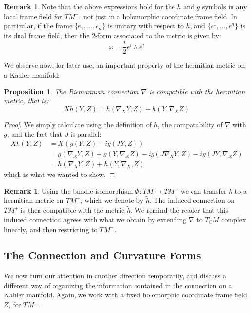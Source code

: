 \documentclass[11pt]{amsart}
\newtheorem{prop}[subsection]{Proposition}
\theoremstyle{definition}
\newtheorem{remark}[subsection]{Remark}
\def \C{ \mathbb{C} }
\def \hsquig{ \tilde{h} }
\begin{document}
\begin{remark}  Note that the above expressions hold for the $h$ and $g$ symbols in any local frame field for $TM^{+}$, not just in a holomorphic coordinate frame field.  In particular, if the frame $\{ e_1, \ldots, e_n \}$ is unitary with respect to $h$, and $ \{ e^1, \ldots, e^n \} $ is its dual frame field, then the 2-form associated to the metric is given by:
%
$$ \omega = \frac{i}{2} e^i \wedge \bar{e}^i $$
%
\end{remark}

 We observe now, for later use, an important property of the hermitian metric on a Kahler manifold:
%
\begin{prop} The Riemannian connection $\nabla$ is compatible with the hermitian metric, that is:
%
$$ X h( Y,Z ) = h( \nabla_X Y, Z ) + h( Y, \nabla_X Z ) $$
%
\end{prop}
%
\begin{proof}
We simply calculate using the definition of $h$, the compatability of $\nabla$ with $g$, and the fact that $J$ is parallel:
%
\begin{align*}
X h(Y,Z) &= X( g(Y,Z) - i g( JY, Z ) ) \\
&= g( \nabla_X Y, Z ) + g( Y, \nabla_X Z ) - i g( J \nabla_X Y, Z ) - i g( JY, \nabla_X Z ) \\
&= h( \nabla_X Y, Z ) + h( Y, \nabla_X, Z)
\end{align*}
%
which is what we wanted to show.
%
\end{proof}
%
\begin{remark} Using the bundle isomorphism $\Phi : TM \rightarrow TM^{+}$ we can transfer $h$ to a hermitian metric on $TM^{+}$, which we denote by $\hsquig$. The induced connection on $TM^{+}$ is then compatible with the metric $\hsquig$.  We remind the reader that this induced connection agrees with what we obtain by extending $\nabla$ to $T_{\C}M$ complex linearly, and then restricting to $TM^{+}$.
\end{remark}

\subsection{ The Connection and Curvature Forms }

We now turn our attention in another direction temporarily, and discuss a different way of organizing the information contained in the connection on a Kahler manifold.  Again, we work with a fixed holomorphic coordinate frame field $Z_i$ for $TM^{+}$. 
\end{document}

